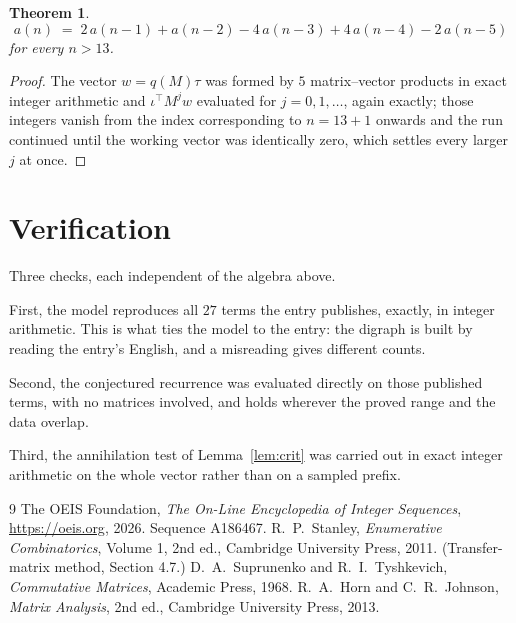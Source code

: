 \documentclass[11pt,a4paper]{article}
\theoremstyle{plain}
\newtheorem{theorem}{Theorem}
\theoremstyle{definition}
\begin{document}
\begin{theorem}
\[
a(n)\;=\;2\,a(n-1) + a(n-2) - 4\,a(n-3) + 4\,a(n-4) - 2\,a(n-5)
\]
for every $n>13$.
\end{theorem}

\begin{proof}
The vector $w=q(M)\tau$ was formed by $5$ matrix--vector products in exact integer
arithmetic and $\iota^{\!\top}M^{j}w$ evaluated for $j=0,1,\dots$, again exactly; those
integers vanish from the index corresponding to $n=13+1$ onwards and the run continued
until the working vector was identically zero, which settles every larger $j$ at once.
\end{proof}

\section{Verification}

Three checks, each independent of the algebra above.

First, the model reproduces all $27$ terms the entry publishes, exactly, in integer
arithmetic. This is what ties the model to the entry: the digraph is built by reading the
entry's English, and a misreading gives different counts.

Second, the conjectured recurrence was evaluated directly on those published terms, with no
matrices involved, and holds wherever the proved range and the data overlap.

Third, the annihilation test of Lemma~\ref{lem:crit} was carried out in exact integer
arithmetic on the whole vector rather than on a sampled prefix.

\begin{thebibliography}{9}
 The OEIS Foundation, \emph{The On-Line Encyclopedia of Integer
Sequences}, \url{https://oeis.org}, 2026. Sequence A186467.
 R.~P.~Stanley, \emph{Enumerative Combinatorics}, Volume 1, 2nd ed.,
Cambridge University Press, 2011. (Transfer-matrix method, Section 4.7.)
 D.~A.~Suprunenko and R.~I.~Tyshkevich, \emph{Commutative Matrices},
Academic Press, 1968.
 R.~A.~Horn and C.~R.~Johnson, \emph{Matrix Analysis}, 2nd ed., Cambridge
University Press, 2013.
\end{thebibliography}
\end{document}
